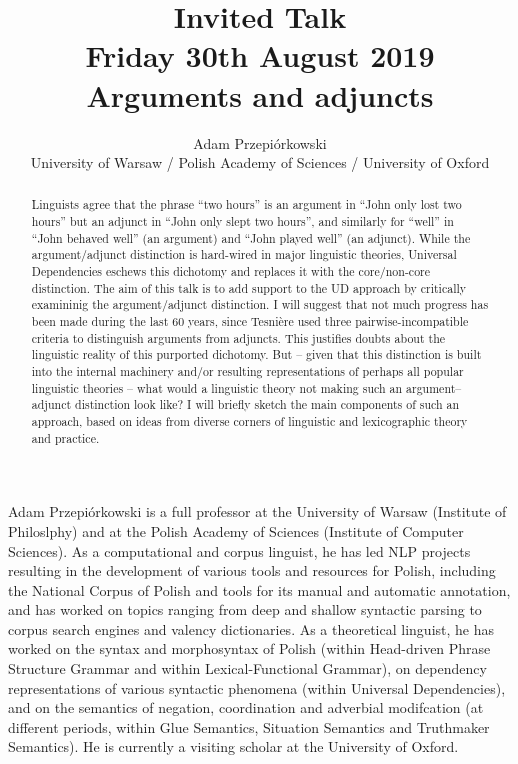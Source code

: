 \documentclass[11pt]{article}
\title{Invited Talk\\
  {\small Friday 30th August 2019}\\
  Arguments and adjuncts}
\author{Adam Przepiórkowski\\
  University of Warsaw / Polish Academy of Sciences / University of Oxford}
\begin{document}
\maketitle
\begin{abstract}
Linguists agree that the phrase “two hours” is an argument in “John only lost two hours” but an adjunct in “John only slept two hours”, and similarly for “well” in “John behaved well” (an argument) and “John played well” (an adjunct). While the argument/adjunct distinction is hard-wired in major linguistic theories, Universal Dependencies eschews this dichotomy and replaces it with the core/non-core distinction. The aim of this talk is to add support to the UD approach by critically examininig the argument/adjunct distinction. I will suggest that not much progress has been made during the last 60 years, since Tesnière used three pairwise-incompatible criteria to distinguish arguments from adjuncts. This justifies doubts about the linguistic reality of this purported dichotomy. But – given that this distinction is built into the internal machinery and/or resulting representations of perhaps all popular linguistic theories – what would a linguistic theory not making such an argument–adjunct distinction look like? I will briefly sketch the main components of such an approach, based on ideas from diverse corners of linguistic and lexicographic theory and practice.
\end{abstract}

\vspace{4mm}
\begin{shortbio}
  Adam Przepiórkowski is a full professor at the University of Warsaw (Institute of Philoslphy) and at the Polish Academy of Sciences (Institute of Computer Sciences). As a computational and corpus linguist, he has led NLP projects resulting in the development of various tools and resources for Polish, including the National Corpus of Polish and tools for its manual and automatic annotation, and has worked on topics ranging from deep and shallow syntactic parsing to corpus search engines and valency dictionaries. As a theoretical linguist, he has worked on the syntax and morphosyntax of Polish (within Head-driven Phrase Structure Grammar and within Lexical-Functional Grammar), on dependency representations of various syntactic phenomena (within Universal Dependencies), and on the semantics of negation, coordination and adverbial modifcation (at different periods, within Glue Semantics, Situation Semantics and Truthmaker Semantics). He is currently a visiting scholar at the University of Oxford.
  
\end{shortbio}
\end{document}
